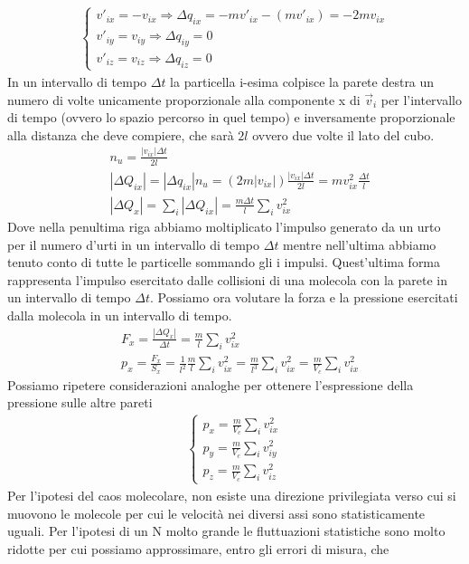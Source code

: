 \documentclass[10pt,a4paper]{article}
\begin{document}
\begin{align*} 
	\begin{cases}
		v'_{ix}=-v_{ix} \Rightarrow \Delta q_{ix} = -mv'_{ix}-(mv'_{ix})=-2mv_{ix}\\
		v'_{iy}=v_{iy} \Rightarrow \Delta q_{iy} = 0\\
		v'_{iz}=v_{iz} \Rightarrow \Delta q_{iz} = 0
	\end{cases}
\end{align*} 
In un intervallo di tempo $\Delta t$ la particella i-esima colpisce la parete destra un numero di volte unicamente proporzionale alla componente x di $\vec{v}_i$ per l'intervallo di tempo (ovvero lo spazio percorso in quel tempo) e inversamente proporzionale alla distanza che deve compiere, che sarà $2l$ ovvero due volte il lato del cubo. 
\begin{align*} 
	&n_u = \frac{|v_{ix}| \Delta t}{2l}\\
	&|\Delta Q_{ix}|= |\Delta q_{ix}| n_u = (2m|v_{ix}|) \frac{|v_{ix}| \Delta t}{2l} = m v_{ix}^2 \frac{\Delta t}{l}\\
	&|\Delta Q_{x}| = \sum_i |\Delta Q_{ix}|= \frac{m \Delta t}{l} \sum_i v_{ix}^2 
\end{align*} 
Dove nella penultima riga abbiamo moltiplicato l'impulso generato da un urto per il numero d'urti in un intervallo di tempo $\Delta t$ mentre nell'ultima abbiamo tenuto conto di tutte le particelle sommando gli i impulsi. Quest'ultima forma rappresenta l'impulso esercitato dalle collisioni di una molecola con la parete in un intervallo di tempo $\Delta t$.
Possiamo ora volutare la forza e la pressione esercitati dalla molecola in un intervallo di tempo. 
\begin{align*} 
	&F_x = \frac{|\Delta Q_{x}|}{\Delta t} =  \frac{m}{l} \sum_i v_{ix}^2\\
	&p_x = \frac{F_{x}}{S_x} =  \frac{1}{l^2}\frac{m}{l} \sum_i v_{ix}^2=\frac{m}{l^3} \sum_i v_{ix}^2 = \frac{m}{V_c} \sum_i v_{ix}^2
\end{align*} 
Possiamo ripetere considerazioni analoghe per ottenere l'espressione della pressione sulle altre pareti
\begin{align*} 
	\begin{cases}
		p_x = \frac{m}{V_c} \sum_i v_{ix}^2\\
		p_y = \frac{m}{V_c} \sum_i v_{iy}^2\\
		p_z = \frac{m}{V_c} \sum_i v_{iz}^2
	\end{cases}
\end{align*} 
Per l'ipotesi del caos molecolare, non esiste una direzione privilegiata verso cui si muovono le molecole per cui le velocità nei diversi assi sono statisticamente uguali. Per l'ipotesi di un N molto grande le fluttuazioni statistiche sono molto ridotte per cui possiamo approssimare, entro gli errori di misura, che 
\end{document}
